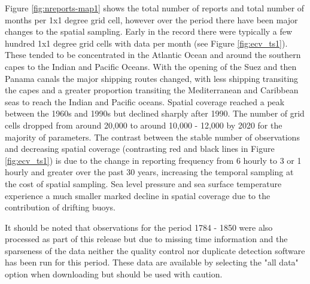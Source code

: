 Figure \ref{fig:nreports-map1} shows the total number of reports and total number of months per 1x1 degree grid cell, however over the period \datatimerange{} there have been major changes to the spatial sampling.
Early in the record there were typically a few hundred 1x1 degree grid cells with data per month (see Figure \ref{fig:ecv_ts1}).
These tended to be concentrated in the Atlantic Ocean and around the southern capes to the Indian and Pacific Oceans.
With the opening of the Suez and then Panama canals the major shipping routes changed, with less shipping transiting the capes and a greater proportion transiting the Mediterranean and Caribbean seas to reach the Indian and Pacific oceans.
Spatial coverage reached a peak between the 1960s and 1990s but declined sharply after 1990.
The number of grid cells dropped from around 20,000 to around 10,000 - 12,000 by 2020 for the majority of parameters. 
The contrast between the stable number of observations and decreasing spatial coverage (contrasting red and black lines in Figure \ref{fig:ecv_ts1}) is due to the change in reporting frequency from 6 hourly to 3 or 1 hourly and greater over the past 30 years, increasing the temporal sampling at the cost of spatial sampling.
Sea level pressure and sea surface temperature experience a much smaller marked decline in spatial coverage due to the contribution of drifting buoys.

It should be noted that observations for the period 1784 - 1850 were also processed as part of this release but due to missing time information and the sparseness of the data neither the quality control nor duplicate detection software has been run for this period. These data are available by selecting the "all data" option when downloading but should be used with caution.


